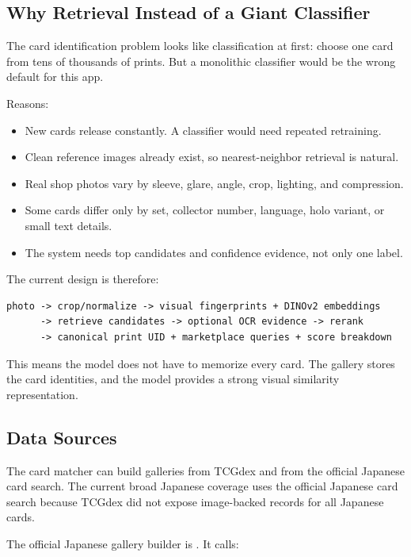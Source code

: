\documentclass[11pt,a4paper]{article}
\begin{document}
\subsection{Why Retrieval Instead of a Giant Classifier}

The card identification problem looks like classification at first: choose one card from tens of thousands of prints. But a monolithic classifier would be the wrong default for this app.

Reasons:

\begin{itemize}
  \item New cards release constantly. A classifier would need repeated retraining.
  \item Clean reference images already exist, so nearest-neighbor retrieval is natural.
  \item Real shop photos vary by sleeve, glare, angle, crop, lighting, and compression.
  \item Some cards differ only by set, collector number, language, holo variant, or small text details.
  \item The system needs top candidates and confidence evidence, not only one label.
\end{itemize}

The current design is therefore:

\begin{lstlisting}
photo -> crop/normalize -> visual fingerprints + DINOv2 embeddings
      -> retrieve candidates -> optional OCR evidence -> rerank
      -> canonical print UID + marketplace queries + score breakdown
\end{lstlisting}

This means the model does not have to memorize every card. The gallery stores the card identities, and the model provides a strong visual similarity representation.

\subsection{Data Sources}

The card matcher can build galleries from TCGdex and from the official Japanese card search. The current broad Japanese coverage uses the official Japanese card search because TCGdex did not expose image-backed records for all Japanese cards.

The official Japanese gallery builder is . It calls:
\end{document}
